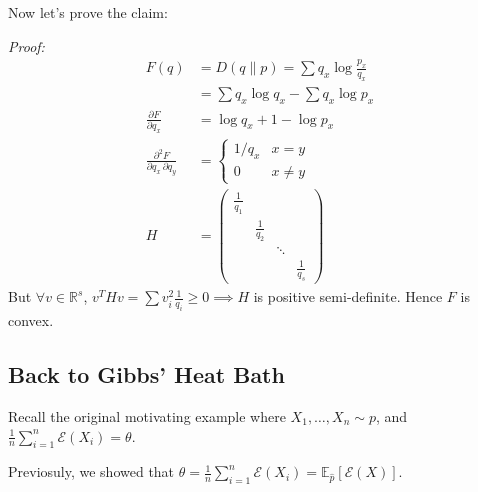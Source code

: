 \documentclass[12pt]{article}
\renewcommand{\hat}[1]{\widehat{#1}}
\newcommand{\R}{\mathbb{R}}
\newcommand{\E}{\mathbb{E}}
\newcommand{\Ec}{\mathcal{E}}
\newenvironment*{proof}[1][blue]{
\begin{tcolorbox}[
    parbox=false,
    colback=#1!5!white,
    colframe=#1!75!black,
    breakable
]}
{\end{tcolorbox}}
\begin{document}
Now let's prove the claim:
\begin{proof}
    \emph{Proof:}
    \begin{align*}
        F(q)                                              & = D(q \parallel p) = \sum q_x \log \frac{p_x}{q_x} \\
                                                          & = \sum q_x \log q_x - \sum q_x \log p_x            \\
        \frac{\partial F}{\partial q_x}                   & = \log q_x + 1 - \log p_x                          \\
        \frac{\partial^2 F}{\partial q_x \, \partial q_y} & = \begin{cases}
                                                                  1/q_x & x = y    \\
                                                                  0     & x \neq y
                                                              \end{cases}                                 \\
        H                                                 & = \begin{pmatrix}
                                                                  \frac{1}{q_1}                             \\
                                                                   & \frac{1}{q_2}                          \\
                                                                   &               & \ddots                 \\
                                                                   &               &        & \frac{1}{q_s}
                                                              \end{pmatrix}
    \end{align*}
    But $\forall v \in \R^s$, $v^T H v = \sum v_i^2 \frac{1}{q_i} \geq 0 \implies H$ is positive semi-definite. Hence $F$ is convex.
\end{proof}

\subsection{Back to Gibbs' Heat Bath}
Recall the original motivating example where $X_1, \dots, X_n \sim p$, and $\frac{1}{n} \sum_{i=1}^{n} \Ec(X_i) = \theta$.

Previosuly, we showed that $\theta = \frac{1}{n} \sum_{i=1}^{n} \Ec(X_i) = \E_{\hat p} [\Ec(X)]$.
\end{document}
